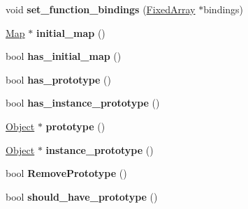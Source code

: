 \begin{DoxyCompactItemize}
\item 
\hypertarget{classv8_1_1internal_1_1_j_s_function_abeae07ff36129d14fd940da4f31daf01}{}void {\bfseries set\+\_\+function\+\_\+bindings} (\hyperlink{classv8_1_1internal_1_1_fixed_array}{Fixed\+Array} $\ast$bindings)\label{classv8_1_1internal_1_1_j_s_function_abeae07ff36129d14fd940da4f31daf01}

\item 
\hypertarget{classv8_1_1internal_1_1_j_s_function_a39c39a721d4a9118d53d34c915efee29}{}\hyperlink{classv8_1_1internal_1_1_map}{Map} $\ast$ {\bfseries initial\+\_\+map} ()\label{classv8_1_1internal_1_1_j_s_function_a39c39a721d4a9118d53d34c915efee29}

\item 
\hypertarget{classv8_1_1internal_1_1_j_s_function_a0fcecef2c7f2454d5e12a869edac5349}{}bool {\bfseries has\+\_\+initial\+\_\+map} ()\label{classv8_1_1internal_1_1_j_s_function_a0fcecef2c7f2454d5e12a869edac5349}

\item 
\hypertarget{classv8_1_1internal_1_1_j_s_function_a8eaec531b93928150a49bd0c4adcd2e9}{}bool {\bfseries has\+\_\+prototype} ()\label{classv8_1_1internal_1_1_j_s_function_a8eaec531b93928150a49bd0c4adcd2e9}

\item 
\hypertarget{classv8_1_1internal_1_1_j_s_function_adf8a786ed191b4a64800590369a0fc6f}{}bool {\bfseries has\+\_\+instance\+\_\+prototype} ()\label{classv8_1_1internal_1_1_j_s_function_adf8a786ed191b4a64800590369a0fc6f}

\item 
\hypertarget{classv8_1_1internal_1_1_j_s_function_ac15422dac06b5ba6ff6b37d429783c6e}{}\hyperlink{classv8_1_1internal_1_1_object}{Object} $\ast$ {\bfseries prototype} ()\label{classv8_1_1internal_1_1_j_s_function_ac15422dac06b5ba6ff6b37d429783c6e}

\item 
\hypertarget{classv8_1_1internal_1_1_j_s_function_a4750f3c732f1ceb46f524a153db32c0f}{}\hyperlink{classv8_1_1internal_1_1_object}{Object} $\ast$ {\bfseries instance\+\_\+prototype} ()\label{classv8_1_1internal_1_1_j_s_function_a4750f3c732f1ceb46f524a153db32c0f}

\item 
\hypertarget{classv8_1_1internal_1_1_j_s_function_a6e566f18a23ee97e6b554b95a5d64bee}{}bool {\bfseries Remove\+Prototype} ()\label{classv8_1_1internal_1_1_j_s_function_a6e566f18a23ee97e6b554b95a5d64bee}

\item 
\hypertarget{classv8_1_1internal_1_1_j_s_function_a5a4415e334550a19b38e8d9c5b898f74}{}bool {\bfseries should\+\_\+have\+\_\+prototype} ()\label{classv8_1_1internal_1_1_j_s_function_a5a4415e334550a19b38e8d9c5b898f74}


\end{DoxyCompactItemize}
